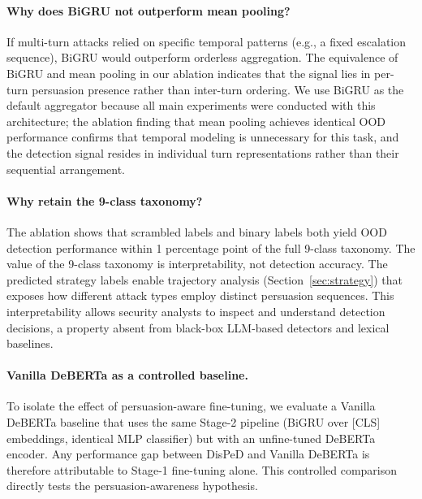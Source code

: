 \paragraph{Why does BiGRU not outperform mean pooling?}
If multi-turn attacks relied on specific temporal patterns (e.g., a fixed escalation sequence), BiGRU would outperform orderless aggregation. The equivalence of BiGRU and mean pooling in our ablation indicates that the signal lies in per-turn persuasion presence rather than inter-turn ordering. We use BiGRU as the default aggregator because all main experiments were conducted with this architecture; the ablation finding that mean pooling achieves identical OOD performance confirms that temporal modeling is unnecessary for this task, and the detection signal resides in individual turn representations rather than their sequential arrangement.

\paragraph{Why retain the 9-class taxonomy?}
The ablation shows that scrambled labels and binary labels both yield OOD detection performance within 1 percentage point of the full 9-class taxonomy. The value of the 9-class taxonomy is interpretability, not detection accuracy. The predicted strategy labels enable trajectory analysis (Section~\ref{sec:strategy}) that exposes how different attack types employ distinct persuasion sequences. This interpretability allows security analysts to inspect and understand detection decisions, a property absent from black-box LLM-based detectors and lexical baselines.

\paragraph{Vanilla DeBERTa as a controlled baseline.}
To isolate the effect of persuasion-aware fine-tuning, we evaluate a Vanilla DeBERTa baseline that uses the same Stage-2 pipeline (BiGRU over [CLS] embeddings, identical MLP classifier) but with an unfine-tuned DeBERTa encoder. Any performance gap between DisPeD and Vanilla DeBERTa is therefore attributable to Stage-1 fine-tuning alone. This controlled comparison directly tests the persuasion-awareness hypothesis.
